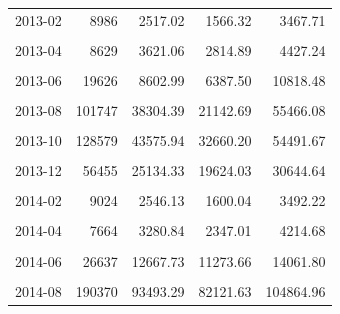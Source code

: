 \begin{longtable}[t]{crrrr}
2013-02 & 8986 & 2517.02 & 1566.32 & 3467.71\\
\cellcolor{gray!10}{2013-03} & \cellcolor{gray!10}{10144} & \cellcolor{gray!10}{4641.01} & \cellcolor{gray!10}{2862.31} & \cellcolor{gray!10}{6419.71}\\
2013-04 & 8629 & 3621.06 & 2814.89 & 4427.24\\
\cellcolor{gray!10}{2013-05} & \cellcolor{gray!10}{12212} & \cellcolor{gray!10}{5456.33} & \cellcolor{gray!10}{4448.90} & \cellcolor{gray!10}{6463.77}\\
2013-06 & 19626 & 8602.99 & 6387.50 & 10818.48\\
\cellcolor{gray!10}{2013-07} & \cellcolor{gray!10}{39124} & \cellcolor{gray!10}{17047.18} & \cellcolor{gray!10}{15522.55} & \cellcolor{gray!10}{18571.81}\\
2013-08 & 101747 & 38304.39 & 21142.69 & 55466.08\\
\cellcolor{gray!10}{2013-09} & \cellcolor{gray!10}{188981} & \cellcolor{gray!10}{68378.16} & \cellcolor{gray!10}{42035.59} & \cellcolor{gray!10}{94720.72}\\
2013-10 & 128579 & 43575.94 & 32660.20 & 54491.67\\
\cellcolor{gray!10}{2013-11} & \cellcolor{gray!10}{59846} & \cellcolor{gray!10}{12229.99} & \cellcolor{gray!10}{3692.23} & \cellcolor{gray!10}{20767.74}\\
2013-12 & 56455 & 25134.33 & 19624.03 & 30644.64\\
\cellcolor{gray!10}{2014-01} & \cellcolor{gray!10}{19362} & \cellcolor{gray!10}{6682.91} & \cellcolor{gray!10}{4784.88} & \cellcolor{gray!10}{8580.94}\\
2014-02 & 9024 & 2546.13 & 1600.04 & 3492.22\\
\cellcolor{gray!10}{2014-03} & \cellcolor{gray!10}{8386} & \cellcolor{gray!10}{2553.64} & \cellcolor{gray!10}{439.65} & \cellcolor{gray!10}{4667.63}\\
2014-04 & 7664 & 3280.84 & 2347.01 & 4214.68\\
\cellcolor{gray!10}{2014-05} & \cellcolor{gray!10}{12084} & \cellcolor{gray!10}{5390.98} & \cellcolor{gray!10}{4370.49} & \cellcolor{gray!10}{6411.46}\\
2014-06 & 26637 & 12667.73 & 11273.66 & 14061.80\\
\cellcolor{gray!10}{2014-07} & \cellcolor{gray!10}{50435} & \cellcolor{gray!10}{20163.17} & \cellcolor{gray!10}{19072.04} & \cellcolor{gray!10}{21254.31}\\
2014-08 & 190370 & 93493.29 & 82121.63 & 104864.96\\

\end{longtable}
